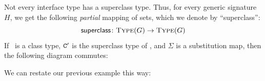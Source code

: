 \documentclass[../generics]{subfiles}
\begin{document}
Not every interface type has a superclass type. Thus, for every generic signature $H$, we get the following \emph{partial} mapping of sets, which we denote by ``\textsf{superclass}'':
\[
\textsf{superclass}\colon \textsc{Type}({G}) \rightarrow \textsc{Type}({G})
\]
If \tC\ is a class type, $\texttt{C}'$ is the superclass type of \tC, and $\Sigma$ is a substitution map, then the following diagram commutes:
\begin{center}
\end{center}

\begin{example}
We can restate our previous example this way:
\begin{center}
\end{center}
\end{example}
\end{document}
